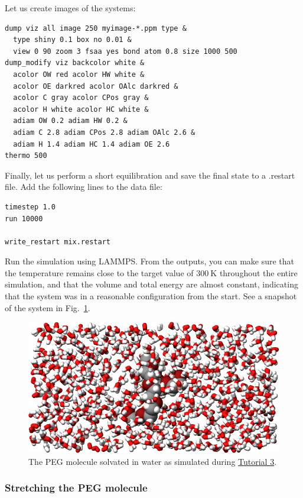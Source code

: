 \documentclass[9pt,tutorial]{livecoms}
\newcommand{\lmpcmd}[1]{\hspace{0pt}\colorbox{listing}{\textcolor{command}{\small{#1}}}\hspace{0pt}} %
\begin{document}
Let us create images of the systems:
\begin{lstlisting}
dump viz all image 250 myimage-*.ppm type &
  type shiny 0.1 box no 0.01 &
  view 0 90 zoom 3 fsaa yes bond atom 0.8 size 1000 500
dump_modify viz backcolor white &
  acolor OW red acolor HW white &
  acolor OE darkred acolor OAlc darkred &
  acolor C gray acolor CPos gray &
  acolor H white acolor HC white &
  adiam OW 0.2 adiam HW 0.2 &
  adiam C 2.8 adiam CPos 2.8 adiam OAlc 2.6 &
  adiam H 1.4 adiam HC 1.4 adiam OE 2.6
thermo 500
\end{lstlisting}
Finally, let us perform a short equilibration and save the
final state to a \lmpcmd{.restart} file.  Add the following lines to the data file:
\begin{lstlisting}
timestep 1.0
run 10000

write_restart mix.restart
\end{lstlisting}
Run the simulation using LAMMPS.  From the outputs, you can make
sure that the temperature remains close to the
target value of $300~\text{K}$ throughout the entire simulation, and that
the volume and total energy are almost constant, indicating
that the system was in a reasonable configuration from the start.
See a snapshot of the system in Fig.~\ref{fig:PEG-solvated}.

\begin{figure}
\centering
\includegraphics[width=\linewidth]{PEG-solvated}
\caption{The PEG molecule solvated in water as simulated during
\hyperref[all-atom-label]{Tutorial 3}.}
\label{fig:PEG-solvated}
\end{figure}

\subsubsection{Stretching the PEG molecule}
\end{document}
